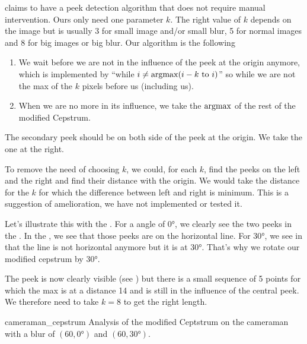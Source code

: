 \cite{Deshpande2014606} claims to have a peek detection
algorithm that does not require manual intervention.
Ours only need one parameter $k$.
The right value of $k$ depends on the image but is
usually 3 for small image and/or small blur,
5 for normal images and 8 for big images or big blur.
Our algorithm is the following
\begin{enumerate}
  \item We wait before we are not in the influence of the peek
    at the origin anymore, which is implemented by
    ``while $i \neq \operatorname{argmax}(i-k\text{ to }i)$'' so
    while we are not the max of the $k$ pixels before us
    (including us).
  \item When we are no more in its influence, we take the
    $\operatorname{argmax}$ of the rest of the modified Cepstrum.
\end{enumerate}

The secondary peek should be on both side of the peek at the
origin.
We take the one at the right.

To remove the need of choosing $k$, we could,
for each $k$, find the peeks on the left and the right and
find their distance with the origin.
We would take the distance for the $k$ for which
the difference between left and right is minimum.
This is a suggestion of amelioration,
we have not implemented or tested it.

Let's illustrate this with the .
For a angle of \ang{0}, we clearly see the two peeks
in the .
In the ,
we see that those peeks are on the horizontal line.
For \ang{30}, we see in 
that the line is not horizontal anymore but it is at \ang{30}.
That's why we rotate our modified cepstrum by \ang{30}.

The peek is now clearly visible (see ) but
there is a small sequence of 5 points for which the max is at a distance
14 and is still in the influence of the central peek.
We therefore need to take $k = 8$ to get the right length.

\begin{myfig}{cameraman_cepstrum}
  {Analysis of the modified Ceptstrum on the cameraman with a blur of $(60,\ang{0})$ and $(60,\ang{30})$.}
\end{myfig}
